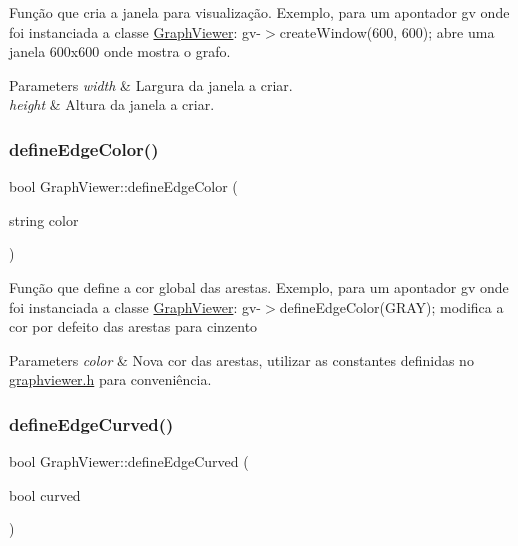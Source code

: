 Função que cria a janela para visualização. Exemplo, para um apontador gv onde foi instanciada a classe \mbox{\hyperlink{class_graph_viewer}{Graph\+Viewer}}\+: gv-\/$>$create\+Window(600, 600); abre uma janela 600x600 onde mostra o grafo.


\begin{DoxyParams}{Parameters}
{\em width} & Largura da janela a criar. \\
\hline
{\em height} & Altura da janela a criar. \\
\hline
\end{DoxyParams}
\mbox{\label{class_graph_viewer_a4102580b69826ba83251ef7bb262f8be}} 
\subsubsection{\texorpdfstring{define\+Edge\+Color()}{defineEdgeColor()}}
{\footnotesize\ttfamily bool Graph\+Viewer\+::define\+Edge\+Color (\begin{DoxyParamCaption}\item[{string}]{color }\end{DoxyParamCaption})}

Função que define a cor global das arestas. Exemplo, para um apontador gv onde foi instanciada a classe \mbox{\hyperlink{class_graph_viewer}{Graph\+Viewer}}\+: gv-\/$>$define\+Edge\+Color(\+G\+R\+A\+Y); modifica a cor por defeito das arestas para cinzento


\begin{DoxyParams}{Parameters}
{\em color} & Nova cor das arestas, utilizar as constantes definidas no \mbox{\hyperlink{graphviewer_8h}{graphviewer.\+h}} para conveniência. \\
\hline
\end{DoxyParams}
\mbox{\label{class_graph_viewer_a08f362be0e682d91e7506dca8caae1b8}} 
\subsubsection{\texorpdfstring{define\+Edge\+Curved()}{defineEdgeCurved()}}
{\footnotesize\ttfamily bool Graph\+Viewer\+::define\+Edge\+Curved (\begin{DoxyParamCaption}\item[{bool}]{curved }\end{DoxyParamCaption})}


